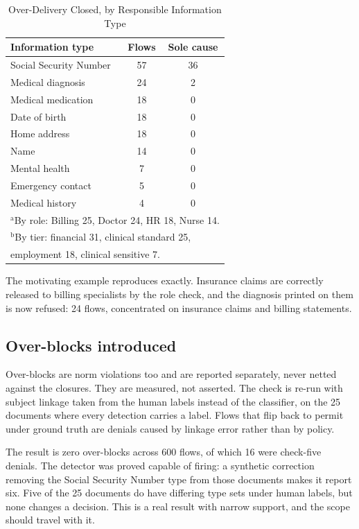 \documentclass[conference]{IEEEtran}
\begin{document}
\begin{table}[htbp]
\caption{Over-Delivery Closed, by Responsible Information Type}
\begin{center}
\begin{tabular}{|l|c|c|}
\hline
\textbf{Information type}&\textbf{Flows}&\textbf{Sole cause} \\
\hline
Social Security Number & 57 & 36 \\
\hline
Medical diagnosis & 24 & 2 \\
\hline
Medical medication & 18 & 0 \\
\hline
Date of birth & 18 & 0 \\
\hline
Home address & 18 & 0 \\
\hline
Name & 14 & 0 \\
\hline
Mental health & 7 & 0 \\
\hline
Emergency contact & 5 & 0 \\
\hline
Medical history & 4 & 0 \\
\hline
\multicolumn{3}{l}{$^{\mathrm{a}}$By role: Billing 25, Doctor 24, HR 18, Nurse 14.} \\
\multicolumn{3}{l}{$^{\mathrm{b}}$By tier: financial 31, clinical standard 25,} \\
\multicolumn{3}{l}{employment 18, clinical sensitive 7.} \\
\end{tabular}
\label{tab:closed}
\end{center}
\end{table}

The motivating example reproduces exactly. Insurance claims are correctly
released to billing specialists by the role check, and the diagnosis printed on
them is now refused: 24 flows, concentrated on insurance claims and billing
statements.

\subsection{Over-blocks introduced}
Over-blocks are norm violations too and are reported separately, never netted
against the closures. They are measured, not asserted. The check is re-run with
subject linkage taken from the human labels instead of the classifier, on the 25
documents where every detection carries a label. Flows that flip back to permit
under ground truth are denials caused by linkage error rather than by policy.

The result is zero over-blocks across 600 flows, of which 16 were check-five
denials. The detector was proved capable of firing: a synthetic correction
removing the Social Security Number type from those documents makes it report
six. Five of the 25 documents do have differing type sets under human labels,
but none changes a decision. This is a real result with narrow support, and the
scope should travel with it.
\end{document}
